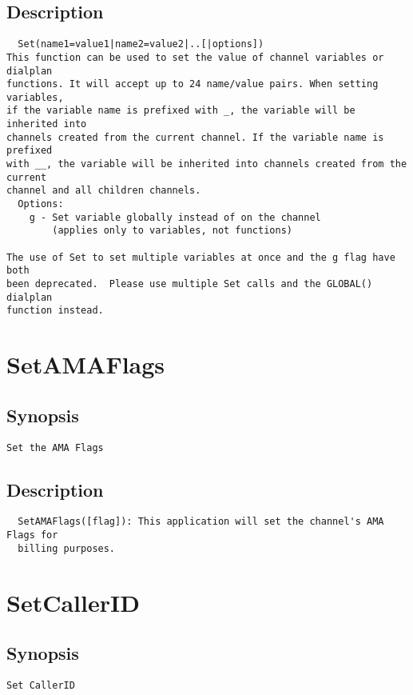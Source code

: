 \subsection{Description}
\begin{verbatim}
  Set(name1=value1|name2=value2|..[|options])
This function can be used to set the value of channel variables or dialplan
functions. It will accept up to 24 name/value pairs. When setting variables,
if the variable name is prefixed with _, the variable will be inherited into
channels created from the current channel. If the variable name is prefixed
with __, the variable will be inherited into channels created from the current
channel and all children channels.
  Options:
    g - Set variable globally instead of on the channel
        (applies only to variables, not functions)

The use of Set to set multiple variables at once and the g flag have both
been deprecated.  Please use multiple Set calls and the GLOBAL() dialplan
function instead.

\end{verbatim}


\section{SetAMAFlags}
\subsection{Synopsis}
\begin{verbatim}
Set the AMA Flags
\end{verbatim}
\subsection{Description}
\begin{verbatim}
  SetAMAFlags([flag]): This application will set the channel's AMA Flags for
  billing purposes.

\end{verbatim}


\section{SetCallerID}
\subsection{Synopsis}
\begin{verbatim}
Set CallerID
\end{verbatim}
